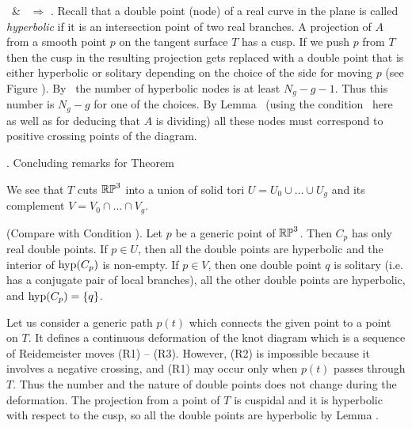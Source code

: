 \medskip
\CondH\ $\&$ \CondCRA\ $\Rightarrow$ \CondWA.
Recall that a double point (node) of a real curve in the plane is called {\it hyperbolic}
if it is an intersection point of two real branches.
A projection of $A$ from a smooth point $p$ on the tangent surface $T$ has a cusp.
If we push $p$ from $T$ then the cusp in the resulting projection gets replaced
with a double point that is either hyperbolic or solitary depending on the choice of
the side for moving $p$ (see Figure \figCusp). By \CondCRA\ the number of hyperbolic nodes
is at least $N_g-g-1$.
Thus this number is $N_g-g$ for
one of the choices.
By Lemma \lemHypPos\ (using the condition \CondH\ here as well
as for deducing that $A$ is dividing) all these nodes must correspond
to positive crossing points of the diagram.







\subhead\sectPropU. Concluding remarks for Theorem \thAnyGenus
\endsubhead

We see that $T$ cuts $\Bbb{RP}^3$ into a union of solid tori $U=U_0\cup\dots\cup U_g$ and
its complement $V=V_0\cap\dots\cap V_g$.

 {\rm(Compare with Condition \CondCRA).}
Let $p$ be a generic point of $\Bbb{RP}^3$. Then $C_p$ has only real double points.
If $p\in U$, then all the double points are hyperbolic %
and the interior of $\operatorname{hyp}(C_p)$ is non-empty.
If $p\in V$, then one double point $q$ is solitary (i.e. has a conjugate pair of local branches),
all the other double points are hyperbolic,
and $\operatorname{hyp}(C_p)=\{q\}$.
\endproclaim

 Let us consider a generic path $p(t)$ which connects the given point to a point on $T$.
It defines a continuous deformation of the knot diagram which is a sequence of Reidemeister moves
(R1) -- (R3). However, (R2) is impossible because it involves a negative crossing, and (R1) may
occur only when $p(t)$ passes through $T$. Thus the number and the nature of double points
does not change during the deformation. The projection from a point of $T$ is cuspidal and it is
hyperbolic with respect to the cusp, so all the double points are hyperbolic by Lemma \lemHypC.

